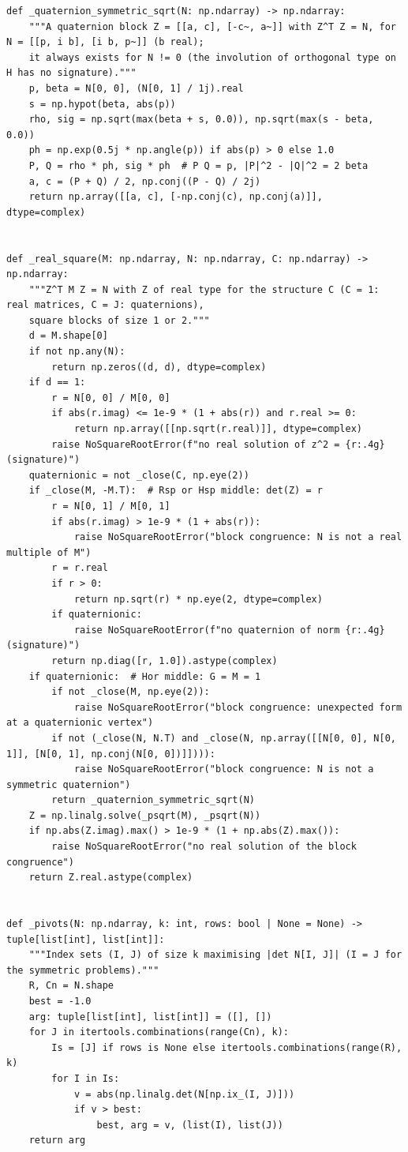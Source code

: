 \documentclass[12pt, a4paper]{report}
\theoremstyle{plain}
\theoremstyle{definition}
\theoremstyle{remark}
\theoremstyle{plain}
\begin{document}
\begin{lstlisting}[style=dsqcode]
def _quaternion_symmetric_sqrt(N: np.ndarray) -> np.ndarray:
    """A quaternion block Z = [[a, c], [-c~, a~]] with Z^T Z = N, for N = [[p, i b], [i b, p~]] (b real);
    it always exists for N != 0 (the involution of orthogonal type on H has no signature)."""
    p, beta = N[0, 0], (N[0, 1] / 1j).real
    s = np.hypot(beta, abs(p))
    rho, sig = np.sqrt(max(beta + s, 0.0)), np.sqrt(max(s - beta, 0.0))
    ph = np.exp(0.5j * np.angle(p)) if abs(p) > 0 else 1.0
    P, Q = rho * ph, sig * ph  # P Q = p, |P|^2 - |Q|^2 = 2 beta
    a, c = (P + Q) / 2, np.conj((P - Q) / 2j)
    return np.array([[a, c], [-np.conj(c), np.conj(a)]], dtype=complex)


def _real_square(M: np.ndarray, N: np.ndarray, C: np.ndarray) -> np.ndarray:
    """Z^T M Z = N with Z of real type for the structure C (C = 1: real matrices, C = J: quaternions),
    square blocks of size 1 or 2."""
    d = M.shape[0]
    if not np.any(N):
        return np.zeros((d, d), dtype=complex)
    if d == 1:
        r = N[0, 0] / M[0, 0]
        if abs(r.imag) <= 1e-9 * (1 + abs(r)) and r.real >= 0:
            return np.array([[np.sqrt(r.real)]], dtype=complex)
        raise NoSquareRootError(f"no real solution of z^2 = {r:.4g} (signature)")
    quaternionic = not _close(C, np.eye(2))
    if _close(M, -M.T):  # Rsp or Hsp middle: det(Z) = r
        r = N[0, 1] / M[0, 1]
        if abs(r.imag) > 1e-9 * (1 + abs(r)):
            raise NoSquareRootError("block congruence: N is not a real multiple of M")
        r = r.real
        if r > 0:
            return np.sqrt(r) * np.eye(2, dtype=complex)
        if quaternionic:
            raise NoSquareRootError(f"no quaternion of norm {r:.4g} (signature)")
        return np.diag([r, 1.0]).astype(complex)
    if quaternionic:  # Hor middle: G = M = 1
        if not _close(M, np.eye(2)):
            raise NoSquareRootError("block congruence: unexpected form at a quaternionic vertex")
        if not (_close(N, N.T) and _close(N, np.array([[N[0, 0], N[0, 1]], [N[0, 1], np.conj(N[0, 0])]]))):
            raise NoSquareRootError("block congruence: N is not a symmetric quaternion")
        return _quaternion_symmetric_sqrt(N)
    Z = np.linalg.solve(_psqrt(M), _psqrt(N))
    if np.abs(Z.imag).max() > 1e-9 * (1 + np.abs(Z).max()):
        raise NoSquareRootError("no real solution of the block congruence")
    return Z.real.astype(complex)


def _pivots(N: np.ndarray, k: int, rows: bool | None = None) -> tuple[list[int], list[int]]:
    """Index sets (I, J) of size k maximising |det N[I, J]| (I = J for the symmetric problems)."""
    R, Cn = N.shape
    best = -1.0
    arg: tuple[list[int], list[int]] = ([], [])
    for J in itertools.combinations(range(Cn), k):
        Is = [J] if rows is None else itertools.combinations(range(R), k)
        for I in Is:
            v = abs(np.linalg.det(N[np.ix_(I, J)]))
            if v > best:
                best, arg = v, (list(I), list(J))
    return arg



\end{lstlisting}
\end{document}
